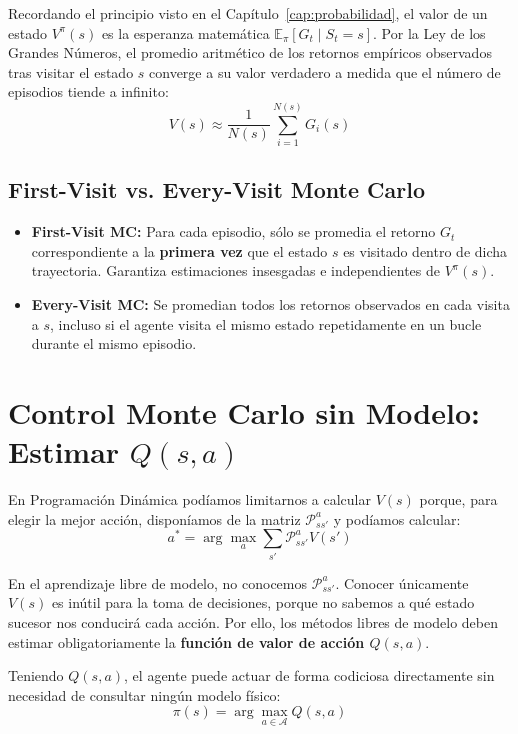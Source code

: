 Recordando el principio visto en el Capítulo~\ref{cap:probabilidad}, el valor de un estado $V^\pi(s)$ es la esperanza matemática $\mathbb{E}_\pi[G_t \mid S_t = s]$. Por la Ley de los Grandes Números, el promedio aritmético de los retornos empíricos observados tras visitar el estado $s$ converge a su valor verdadero a medida que el número de episodios tiende a infinito:
\begin{equation}
  V(s) \approx \frac{1}{N(s)} \sum_{i=1}^{N(s)} G_i(s)
\end{equation}

\subsection{First-Visit vs. Every-Visit Monte Carlo}
\begin{itemize}
  \item \textbf{First-Visit MC:} Para cada episodio, sólo se promedia el retorno $G_t$ correspondiente a la \textbf{primera vez} que el estado $s$ es visitado dentro de dicha trayectoria. Garantiza estimaciones insesgadas e independientes de $V^\pi(s)$.
  \item \textbf{Every-Visit MC:} Se promedian todos los retornos observados en cada visita a $s$, incluso si el agente visita el mismo estado repetidamente en un bucle durante el mismo episodio.
\end{itemize}

\section{Control Monte Carlo sin Modelo: Estimar $Q(s,a)$}
En Programación Dinámica podíamos limitarnos a calcular $V(s)$ porque, para elegir la mejor acción, disponíamos de la matriz $\mathcal{P}_{ss'}^a$ y podíamos calcular:
\[
  a^* = \arg\max_a \sum_{s'} \mathcal{P}_{ss'}^a V(s')
\]
\begin{ideaclave}
En el aprendizaje libre de modelo, no conocemos $\mathcal{P}_{ss'}^a$. Conocer únicamente $V(s)$ es inútil para la toma de decisiones, porque no sabemos a qué estado sucesor nos conducirá cada acción. Por ello, los métodos libres de modelo deben estimar obligatoriamente la \textbf{función de valor de acción $Q(s,a)$}.
\end{ideaclave}

Teniendo $Q(s,a)$, el agente puede actuar de forma codiciosa directamente sin necesidad de consultar ningún modelo físico:
\begin{equation}
  \pi(s) = \arg\max_{a \in \mathcal{A}} Q(s,a)
\end{equation}

